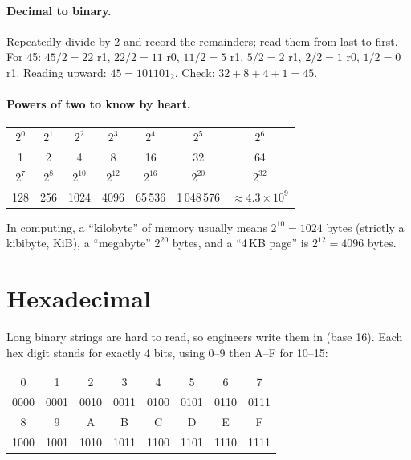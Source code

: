 \paragraph{Decimal to binary.} Repeatedly divide by 2 and record the remainders; read them from last to first. For 45: $45/2 = 22$ r1, $22/2 = 11$ r0, $11/2 = 5$ r1, $5/2 = 2$ r1, $2/2 = 1$ r0, $1/2 = 0$ r1. Reading upward: $45 = 101101_2$. Check: $32+8+4+1 = 45$.

\paragraph{Powers of two to know by heart.}
\begin{center}
\begin{tabular}{ccccccc}
\toprule
$2^0$ & $2^1$ & $2^2$ & $2^3$ & $2^4$ & $2^5$ & $2^6$ \\
1 & 2 & 4 & 8 & 16 & 32 & 64 \\
\midrule
$2^7$ & $2^8$ & $2^{10}$ & $2^{12}$ & $2^{16}$ & $2^{20}$ & $2^{32}$ \\
128 & 256 & 1024 & 4096 & 65\,536 & 1\,048\,576 & $\approx 4.3\times10^9$ \\
\bottomrule
\end{tabular}
\end{center}

In computing, a ``kilobyte'' of memory usually means $2^{10} = 1024$ bytes (strictly a kibibyte, KiB), a ``megabyte'' $2^{20}$ bytes, and a ``4\,KB page'' is $2^{12} = 4096$ bytes.

\section{Hexadecimal}

Long binary strings are hard to read, so engineers write them in  (base 16). Each hex digit stands for exactly 4 bits, using 0--9 then A--F for 10--15:

\begin{center}
\begin{tabular}{cccccccc}
\toprule
0 & 1 & 2 & 3 & 4 & 5 & 6 & 7 \\
0000 & 0001 & 0010 & 0011 & 0100 & 0101 & 0110 & 0111 \\
\midrule
8 & 9 & A & B & C & D & E & F \\
1000 & 1001 & 1010 & 1011 & 1100 & 1101 & 1110 & 1111 \\
\bottomrule
\end{tabular}
\end{center}

